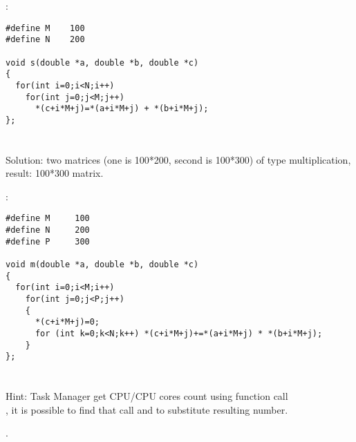 :

\begin{lstlisting}
#define M    100
#define N    200

void s(double *a, double *b, double *c)
{
  for(int i=0;i<N;i++)
    for(int j=0;j<M;j++)
      *(c+i*M+j)=*(a+i*M+j) + *(b+i*M+j);
};
\end{lstlisting}

\section{}

{Solution: two matrices (one is 100*200, second is 100*300) of \Tdouble type multiplication, result: 100*300
matrix.}

:

\begin{lstlisting}
#define M     100
#define N     200
#define P     300

void m(double *a, double *b, double *c)
{
  for(int i=0;i<M;i++)
    for(int j=0;j<P;j++)
    {
      *(c+i*M+j)=0;
      for (int k=0;k<N;k++) *(c+i*M+j)+=*(a+i*M+j) * *(b+i*M+j);
    }
};
\end{lstlisting}

\section{}

{Hint: Task Manager get CPU/CPU cores count using function call \\
, it is possible to find that
call and to substitute resulting number.}

.

\section{}

